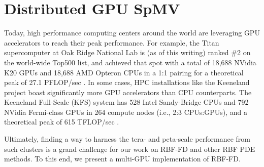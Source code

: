 

\chapter{Distributed GPU SpMV}
\label{chap:multigpu_rbffd}





Today, high performance computing centers around the world are leveraging GPU accelerators to reach their peak performance. For example, the Titan supercomputer at Oak Ridge National Lab is (as of this writing) ranked \#2 on the world-wide Top500 list, and achieved that spot with a total of 18,688 NVidia K20 GPUs and 18,688 AMD Opteron CPUs in a 1:1 pairing for a theoretical peak of 27.1 PFLOP/sec \cite{TitanGPUCluster}. 
In some cases, HPC installations like the Keeneland project \cite{Vetter2011} boast significantly more GPU accelerators than CPU counterparts. The Keeneland Full-Scale (KFS) system has 528 Intel Sandy-Bridge CPUs and 792 NVidia Fermi-class GPUs in 264 compute nodes (i.e., 2:3 CPUs:GPUs), and a theoretical peak of 615 TFLOP/sec \cite{Vetter2011}. 

Ultimately, finding a way to harness the tera- and peta-scale performance from such clusters is a grand challenge for our work on RBF-FD and other RBF PDE methods. To this end, we present a multi-GPU implementation of RBF-FD.

